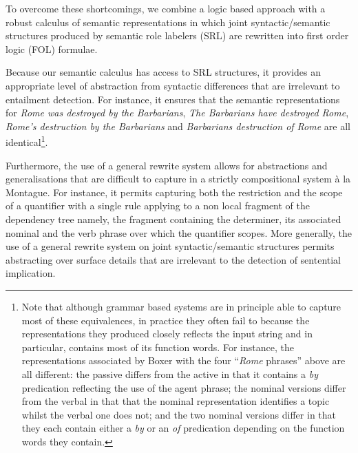 \documentclass[twocolumn,10pt]{article}
\renewcommand\cite{\citep}
\begin{document}
To overcome these shortcomings, we combine a logic based approach with
a robust calculus of semantic representations in which joint
syntactic/semantic structures produced by semantic role labelers (SRL)
are rewritten into first order logic (FOL) formulae.

Because our semantic calculus has access to SRL structures, it
provides an appropriate level of abstraction from syntactic
differences that are irrelevant to entailment detection. For instance,
it ensures that the semantic representations for {\it Rome was
  destroyed by the Barbarians}, {\it The Barbarians have destroyed
  Rome}, {\it Rome's destruction by the Barbarians} and {\it Barbarians
  destruction of Rome} are all identical\footnote{Note that although
  grammar based systems are in principle able to capture most of these
  equivalences, in practice they often fail to because the
  representations they produced closely reflects the input string and
  in particular, contains most of its function words. For instance,
  the representations associated by Boxer \cite{boxer} with the four
  ``{\it Rome} phrases'' above are all different: the passive differs
  from the active in that it contains a {\it by} predication
  reflecting the use of the agent phrase; the nominal versions differ
  from the verbal in that that the nominal representation identifies a
  topic whilst the verbal one does not; and the two nominal versions
  differ in that they each contain either a {\it by} or an {\it of}
  predication depending on the function words they contain.}.

Furthermore, the use of a general rewrite system allows for
abstractions and generalisations that are difficult to capture in a
strictly compositional system à la Montague. For instance, it permits
capturing both the restriction and the scope of a quantifier with a
single rule applying to a non local fragment of the dependency tree
namely, the fragment containing the determiner, its associated nominal
and the verb phrase over which the quantifier scopes. More generally,
the use of a general rewrite system on joint syntactic/semantic
structures permits abstracting over surface details that are
irrelevant to the detection of sentential implication.




\end{document}
